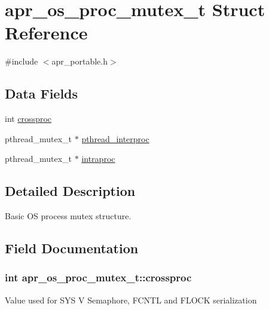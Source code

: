 \hypertarget{structapr__os__proc__mutex__t}{}\section{apr\+\_\+os\+\_\+proc\+\_\+mutex\+\_\+t Struct Reference}
\label{structapr__os__proc__mutex__t}


{\ttfamily \#include $<$apr\+\_\+portable.\+h$>$}

\subsection*{Data Fields}
\begin{DoxyCompactItemize}
\item 
int \hyperlink{structapr__os__proc__mutex__t_ab75e29a654ba0ff0dc491b625308fb79}{crossproc}
\item 
pthread\+\_\+mutex\+\_\+t $\ast$ \hyperlink{structapr__os__proc__mutex__t_aed588bef2efc836e5a768f32638e89c1}{pthread\+\_\+interproc}
\item 
pthread\+\_\+mutex\+\_\+t $\ast$ \hyperlink{structapr__os__proc__mutex__t_aa2e01fa37b652185a0dd3fae80caa4ad}{intraproc}
\end{DoxyCompactItemize}


\subsection{Detailed Description}
Basic OS process mutex structure. 

\subsection{Field Documentation}
\subsubsection[{\texorpdfstring{crossproc}{crossproc}}]{\setlength{\rightskip}{0pt plus 5cm}int apr\+\_\+os\+\_\+proc\+\_\+mutex\+\_\+t\+::crossproc}\hypertarget{structapr__os__proc__mutex__t_ab75e29a654ba0ff0dc491b625308fb79}{}\label{structapr__os__proc__mutex__t_ab75e29a654ba0ff0dc491b625308fb79}
Value used for S\+YS V Semaphore, F\+C\+N\+TL and F\+L\+O\+CK serialization 
